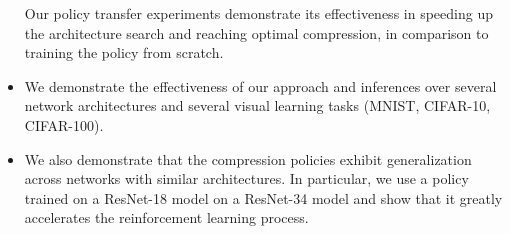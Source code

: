 \documentclass[../main]{subfiles}
\begin{document}
\begin{itemize}
            Our policy transfer experiments demonstrate its effectiveness in speeding up the architecture search and reaching optimal compression, in comparison to training the policy from scratch.
            \item We demonstrate the effectiveness of our approach and inferences over several network architectures and several visual learning tasks (MNIST, CIFAR-10, CIFAR-100).
            \item We also demonstrate that the compression policies exhibit generalization across networks with similar architectures.
            In particular, we use a policy trained on a ResNet-18 model on a ResNet-34 model and show that it greatly accelerates the reinforcement learning process.
        \end{itemize}

\end{document}
